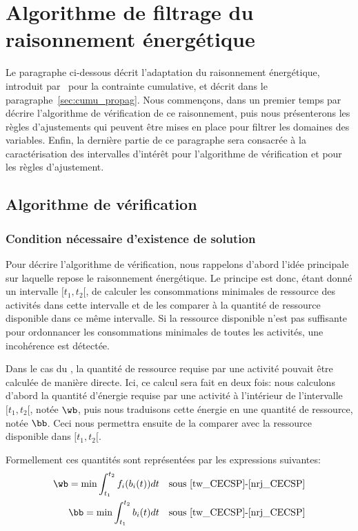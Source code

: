 \section{Algorithme de filtrage du raisonnement énergétique}
\label{sec:ER_CECSP}

Le paragraphe ci-dessous décrit l'adaptation du raisonnement
énergétique, introduit par~\cite{RELopez} pour la contrainte cumulative,
et décrit dans le paragraphe~\ref{sec:cumu_propag}. Nous commençons,
dans un premier temps par décrire l'algorithme de vérification de ce
raisonnement, puis nous présenterons les règles d'ajustements qui
peuvent être mises en place pour filtrer les domaines des
variables. Enfin, la dernière partie de ce paragraphe sera consacrée à
la caractérisation des intervalles d'intérêt pour l'algorithme de
vérification et pour les règles d'ajustement.

\subsection{Algorithme de vérification}

\subsubsection{Condition nécessaire d'existence de solution}
Pour décrire l'algorithme de vérification, nous rappelons d'abord
l'idée principale sur laquelle repose le raisonnement énergétique. Le
principe est donc, étant donné un intervalle $[t_1,t_2[$, de calculer
les consommations minimales de ressource des activités dans cette
intervalle et de les comparer à la quantité de ressource disponible
dans ce même intervalle. Si la ressource disponible n'est pas
suffisante pour ordonnancer les consommations minimales de toutes les
activités, une incohérence est détectée.

Dans le cas du \CUSP, la quantité de ressource requise par une
activité pouvait être calculée de manière directe. Ici, ce calcul sera
fait en deux fois: nous calculons d'abord la quantité d'énergie
requise par une activité à l'intérieur de l'intervalle $[t_1,t_2{[}$,
notée $\wb$, puis nous traduisons cette énergie en une quantité de
ressource, notée $\bb$. Ceci nous permettra ensuite de la comparer
avec la ressource disponible dans $[t_1,t_2{[}$.

Formellement ces quantités sont représentées par les expressions
suivantes: 
\begin{align}
  \wb= \min \int_{t_1}^{t_2} f_i(b_i(t))dt & & \text{sous 
                                               \eqref{tw_CECSP}-\eqref{nrj_CECSP}}\\
  \bb= \min \int_{t_1}^{t_2} b_i(t)dt & & \text{sous 
                                          \eqref{tw_CECSP}-\eqref{nrj_CECSP}} \label{eq:minConso}
\end{align}

